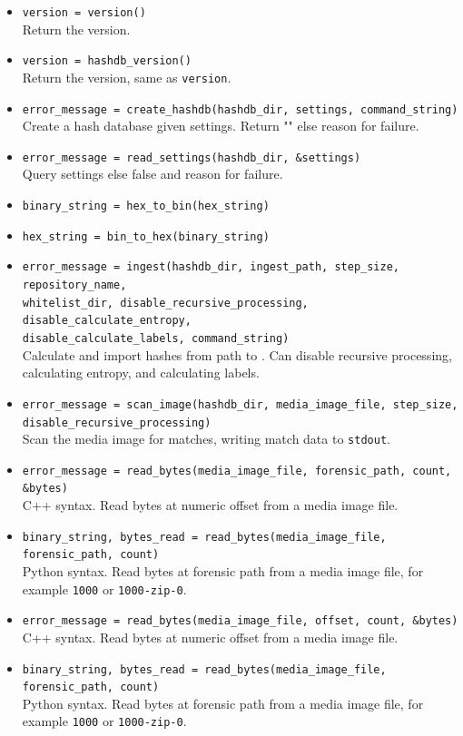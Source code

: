 \documentclass[11pt,fleqn]{article} %
\begin{document}
\begin{itemize}
\item \verb+version = version()+\\
Return the \hdb version.
\item \verb+version = hashdb_version()+\\
Return the \hdb version, same as \verb+version+.
\item \verb+error_message = create_hashdb(hashdb_dir, settings, command_string)+\\
Create a hash database given settings. Return "" else reason for failure.
\item \verb+error_message = read_settings(hashdb_dir, &settings)+\\
Query settings else false and reason for failure.
\item \verb+binary_string = hex_to_bin(hex_string)+
\item \verb+hex_string = bin_to_hex(binary_string)+
\item \verb+error_message = ingest(hashdb_dir, ingest_path, step_size, repository_name,+\\
\verb+whitelist_dir, disable_recursive_processing, disable_calculate_entropy,+\\
\verb+disable_calculate_labels, command_string)+\\
Calculate and import hashes from path to \hdb. Can disable recursive processing, calculating entropy, and calculating labels.
\item \verb+error_message = scan_image(hashdb_dir, media_image_file, step_size,+\\
\verb+disable_recursive_processing)+\\
Scan the media image for matches, writing match data to \verb+stdout+.
\item \verb+error_message = read_bytes(media_image_file, forensic_path, count, &bytes)+\\
C++ syntax.  Read bytes at numeric offset from a media image file.
\item \verb+binary_string, bytes_read = read_bytes(media_image_file, forensic_path, count)+\\
Python syntax. Read bytes at forensic path from a media image file, for example \verb+1000+ or \verb+1000-zip-0+.
\item \verb+error_message = read_bytes(media_image_file, offset, count, &bytes)+\\
C++ syntax.  Read bytes at numeric offset from a media image file.
\item \verb+binary_string, bytes_read = read_bytes(media_image_file, forensic_path, count)+\\
Python syntax. Read bytes at forensic path from a media image file, for example \verb+1000+ or \verb+1000-zip-0+.
\end{itemize}
\end{document}
